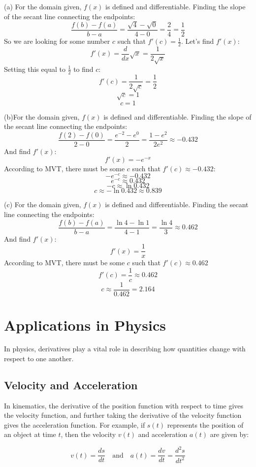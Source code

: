 \begin{Answer}
[ref=MVT2]
(a) For the domain given, $f(x)$ is defined and differentiable. Finding the slope of the secant line connecting the endpoints:
$$\frac{f(b)-f(a)}{b-a}=\frac{\sqrt{4}-\sqrt{0}}{4-0}=\frac{2}{4}=\frac{1}{2}$$
So we are looking for some number $c$ such that $f'(c) = \frac{1}{2}$. Let's find $f'(x)$:
$$f'(x) = \frac{d}{dx}\sqrt{x}=\frac{1}{2\sqrt{x}}$$
Setting this equal to $\frac{1}{2}$ to find $c$:
$$f'(c) = \frac{1}{2\sqrt{c}}=\frac{1}{2}$$
$$\sqrt{c}=1$$
$$c=1$$

(b)For the domain given, $f(x)$ is defined and differentiable. Finding the slope of the secant line connecting the endpoints:
$$\frac{f(2)-f(0)}{2-0}=\frac{e^{-2}-e^{0}}{2}=\frac{1-e^{2}}{2e^{2}}\approx -0.432$$
And find $f'(x)$:
$$f'(x) = -e^{-x}$$
According to MVT, there must be some $c$ such that $f'(c) \approx-0.432$:
$$-e^{-c} \approx -0.432$$
$$e^{-c}\approx 0.432$$
$$-c \approx \ln{0.432}$$
$$c \approx -\ln{0.432} \approx 0.839$$

(c) For the domain given, $f(x)$ is defined and differentiable. Finding the secant line connecting the endpoints:
$$\frac{f(b)-f(a)}{b-a}=\frac{\ln{4}-\ln{1}}{4-1}=\frac{\ln{4}}{3}\approx 0.462$$
And find $f'(x)$:
$$f'(x) = \frac{1}{x}$$
According to MVT, there must be some $c$ such that $f'(c) \approx 0.462$
$$f'(c) = \frac{1}{c} \approx 0.462$$
$$c \approx \frac{1}{0.462} = 2.164$$
\end{Answer}



\section{Applications in Physics}

In physics, derivatives play a vital role in describing how quantities
change with respect to one another.

\subsection{Velocity and Acceleration}

In kinematics, the derivative of the position function with respect to
time gives the velocity function, and further taking the derivative of
the velocity function gives the acceleration function. For example, if
$s(t)$ represents the position of an object at time $t$, then the
velocity $v(t)$ and acceleration $a(t)$ are given by:

\begin{equation}
v(t) = \frac{ds}{dt} \quad \text{and} \quad a(t) = \frac{dv}{dt} = \frac{d^2s}{dt^2}
\end{equation}

